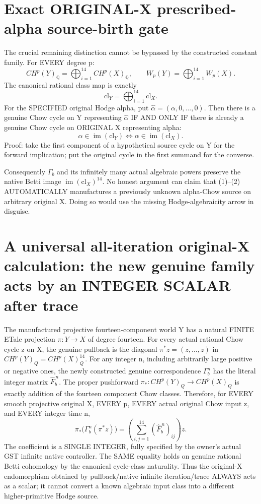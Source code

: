 \documentclass[11pt]{article}
\begin{document}
\section{Exact ORIGINAL-X prescribed-alpha source-birth gate}
The crucial remaining distinction cannot
be bypassed by the constructed constant family.
For EVERY degree p:
\[
CH^p(Y)_{\mathbb Q}
=\bigoplus_{i=1}^{14}CH^p(X)_{\mathbb Q},
\qquad
W_p(Y)=\bigoplus_{i=1}^{14}W_p(X).
\]
The canonical rational class map is exactly
\[
\mathrm{cl}_Y=\bigoplus_{i=1}^{14}
\mathrm{cl}_X.
\]
For the SPECIFIED original Hodge alpha,
put \(\widehat\alpha=(\alpha,0,\ldots,0)\).
Then there is a genuine Chow cycle on
Y representing \(\widehat\alpha\)
IF AND ONLY IF there is already a genuine
Chow cycle on ORIGINAL X representing alpha:
\[
\boxed{
\widehat\alpha\in\operatorname{im}(\mathrm{cl}_Y)
\iff
\alpha\in\operatorname{im}(\mathrm{cl}_X).
}\tag{3}
\]
Proof: take the first component of a
hypothetical source cycle on Y for the
forward implication; put the original
cycle in the first summand for the converse.

Consequently \(\Gamma_b\) and its infinitely
many actual algebraic powers preserve
the native Betti image
\(\operatorname{im}(\mathrm{cl}_X)^{14}\).
No honest argument can claim that
(1)--(2) AUTOMATICALLY manufactures
a previously unknown alpha-Chow source
on arbitrary original X. Doing so
would use the missing Hodge-algebraicity
arrow in disguise.


\section{A universal all-iteration original-X calculation: the new genuine family acts by an INTEGER SCALAR after trace}
The manufactured projective fourteen-component world
Y has a natural FINITE ETale projection
\(\pi:Y\to X\) of degree fourteen.
For every actual rational Chow cycle z on X,
the genuine pullback is the diagonal
\(\pi^*z=(z,\ldots,z)\) in
\(CH^p(Y)_Q=CH^p(X)_Q^{14}\).
For any integer n, including arbitrarily
large positive or negative ones,
the newly constructed genuine
correspondence \(\Gamma_b^n\)
has the literal integer matrix
\(\widehat F_b^{\,n}\).
The proper pushforward
\(\pi_*:CH^p(Y)_Q\to CH^p(X)_Q\)
is exactly addition of the fourteen
component Chow classes.
Therefore, for EVERY smooth projective
original X, EVERY p, EVERY actual
original Chow input z, and EVERY
integer time n,
\[
\boxed{
\pi_*\bigl(\Gamma_b^n(\pi^*z)\bigr)
=\left(\sum_{i,j=1}^{14}
 (\widehat F_b^{\,n})_{ij}\right)z .
}\tag{12}
\]
The coefficient is a SINGLE INTEGER,
fully specified by the owner's actual
GST infinite native controller.
The SAME equality holds on genuine
rational Betti cohomology by the
canonical cycle-class naturality.
Thus the original-X endomorphism
obtained by pullback/native infinite
iteration/trace ALWAYS acts as a scalar;
it cannot convert a known algebraic
input class into a different
higher-primitive Hodge source.
\end{document}
